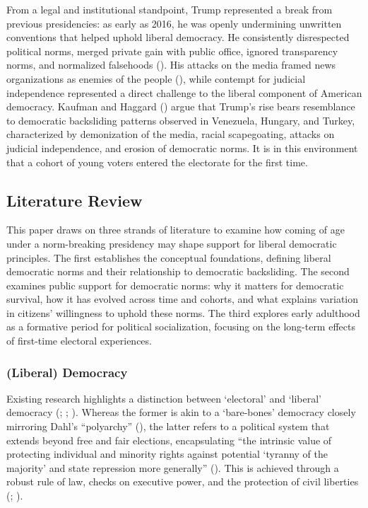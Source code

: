 \documentclass[
  10pt,
  letterpaper,
  DIV=11,
  numbers=noendperiod]{scrartcl}
\begin{document}
From a legal and institutional standpoint, Trump represented a break
from previous presidencies: as early as 2016, he was openly undermining
unwritten conventions that helped uphold liberal democracy. He
consistently disrespected political norms, merged private gain with
public office, ignored transparency norms, and normalized falsehoods
(). His attacks on the media
framed news organizations as enemies of the people
(), while contempt for judicial
independence represented a direct challenge to the liberal component of
American democracy. Kaufman and Haggard
() argue that Trump's rise bears
resemblance to democratic backsliding patterns observed in Venezuela,
Hungary, and Turkey, characterized by demonization of the media, racial
scapegoating, attacks on judicial independence, and erosion of
democratic norms. It is in this environment that a cohort of young
voters entered the electorate for the first time.

\subsection{Literature Review}\label{literature-review}

This paper draws on three strands of literature to examine how coming of
age under a norm-breaking presidency may shape support for liberal
democratic principles. The first establishes the conceptual foundations,
defining liberal democratic norms and their relationship to democratic
backsliding. The second examines public support for democratic norms:
why it matters for democratic survival, how it has evolved across time
and cohorts, and what explains variation in citizens' willingness to
uphold these norms. The third explores early adulthood as a formative
period for political socialization, focusing on the long-term effects of
first-time electoral experiences.

\subsubsection{(Liberal) Democracy}\label{liberal-democracy}

Existing research highlights a distinction between `electoral' and
`liberal' democracy (;
;
). Whereas the former is akin to a
`bare-bones' democracy closely mirroring Dahl's ``polyarchy''
(), the latter refers to a political
system that extends beyond free and fair elections, encapsulating ``the
intrinsic value of protecting individual and minority rights against
potential `tyranny of the majority' and state repression more
generally'' ().
This is achieved through a robust rule of law, checks on executive
power, and the protection of civil liberties
(;
).
\end{document}
